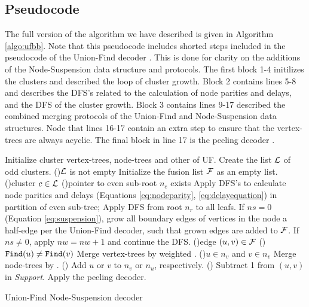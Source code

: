 \subsection{Pseudocode}

The full version of the algorithm we have described is given in Algorithm \ref{algo:ufbb}. Note that this pseudocode includes shorted steps included in the pseudocode of the Union-Find decoder \cite{delfosse2017almost}. This is done for clarity on the additions of the Node-Suspension data structure and protocols. The first block 1-4 initilizes the clusters and described the loop of cluster growth. Block 2 contains lines 5-8 and describes the DFS's related to the calculation of node parities and delays, and the DFS of the cluster growth. Block 3 contains lines 9-17 described the combined merging protocols of the Union-Find and Node-Suspension data structures. Node that lines 16-17 contain an extra step to ensure that the vertex-trees are always acyclic. The final block in line 17 is the peeling decoder \cite{delfosse2017linear}. 
\begin{algorithm}[htbp]
    \BlankLine
    \BlankLine
    Initialize cluster vertex-trees, node-trees and other of UF.\;
    Create the list $\mathcal{L}$ of odd clusters.\;
    \While(){$\mathcal{L}$ is not empty}{
      Initialize the fusion list $\mathcal{F}$ as an empty list.\;
      \For(){cluster $c\in\mathcal{L}$}{
        \If(){pointer to even sub-root $n_e$ exists}{
          Apply DFS's to calculate node parities and delays (Equations \eqref{eq:nodeparity}, \eqref{eq:delayequation}) in partition of even sub-tree;
        }
        Apply DFS from root $n_r$ to all leafs. If $ns=0$ (Equation \eqref{eq:suspension}), grow all boundary edges of vertices in the node a half-edge per the Union-Find decoder, such that grown edges are added to $\mathcal{F}$. If $ns\neq0$, apply $nw=nw+1$ and continue the DFS.\;
      }
      \For(){edge $(u,v) \in \mathcal{F}$}{
        \eIf(){$\texttt{Find}(u)\neq\texttt{Find}(v)$}{
          Merge vertex-trees by weighted .\;
          \eIf(){$u \in n_v$ and $v \in n_v$}{
            Merge node-trees by .\;
          }(){
            Add $u$ or $v$ to $n_v$ or $n_u$, respectively.\;
          }
        }(){
          Subtract 1 from $(u,v)$ in \emph{Support}.\;
        }
      }
    }
    Apply the peeling decoder.
    \caption{Union-Find Node-Suspension decoder}\label{algo:ufbb}
  \end{algorithm}
    